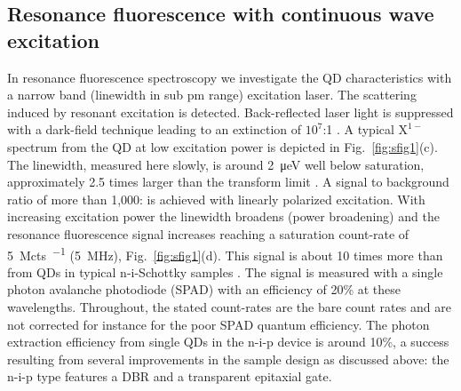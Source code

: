 \documentclass[aps,prl,reprint,superscriptaddress]{revtex4-1}
\begin{document}
\subsection{Resonance fluorescence with continuous wave excitation}


In resonance fluorescence spectroscopy we investigate the QD characteristics with a narrow band (linewidth in sub \si{\pico\meter} range) excitation laser.
The scattering induced by resonant excitation is detected. Back-reflected laser light is suppressed with a dark-field technique leading to an extinction of $10^7$:1 \cite{Kuhlmann2013_NatPhys,Kuhlmann2013_RSI}. A typical $\mathrm{X}^{1-}$ spectrum from the QD at low excitation power is depicted in Fig.\ \ref{fig:sfig1}(c). The linewidth, measured here slowly, is around \SI{2}{\micro\electronvolt} well below saturation, approximately 2.5 times larger than the transform limit \cite{Kuhlmann2013_NatPhys}. A signal to background ratio of more than 1,000: is achieved with linearly polarized excitation. With increasing excitation power the linewidth broadens (power broadening) and the resonance fluorescence signal increases reaching a saturation count-rate of \SI{5}{\mega cts\per\sec} (\SI{5}{\mega\hertz}), Fig.\ \ref{fig:sfig1}(d). This signal is about 10 times more than from QDs in typical n-i-Schottky samples \cite{Kuhlmann2013_NatPhys}. The signal is measured with a single photon avalanche photodiode (SPAD) with an efficiency of 20\% at these wavelengths. Throughout, the stated count-rates are the bare count rates and are not corrected for instance for the poor SPAD quantum efficiency. The photon extraction efficiency from single QDs in the n-i-p device is around 10\%, a success resulting from several improvements in the sample design as discussed above: the n-i-p type features a DBR and a transparent epitaxial gate.
\end{document}
